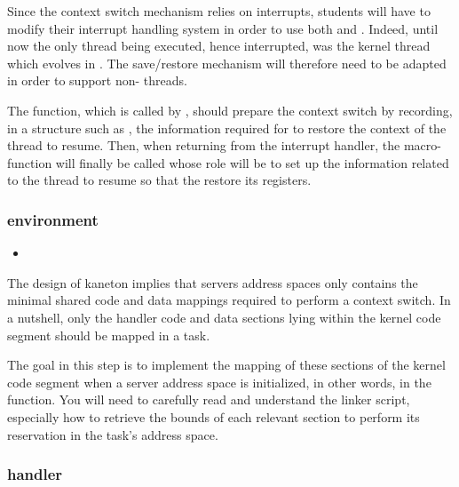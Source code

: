 Since the context switch mechanism relies on interrupts, students will
have to modify their interrupt handling system in order to use both
 and
. Indeed, until now the only thread
being executed, hence interrupted, was the kernel thread which evolves in
. The save/restore mechanism will therefore need to be adapted
in order to support non- threads.

The  function, which is called by
, should prepare the context switch by
recording, in a structure such as , the information
required for  to restore the context
of the thread to resume. Then, when returning from the interrupt handler,
the  macro-function will finally be
called whose role will be to set up the information related to the thread
to resume so that the  restore its registers.

\subsubsection*{environment}

\begin{itemize}
  \item
\end{itemize}

The design of kaneton implies that servers address spaces only contains the
minimal shared code and data mappings required to perform a context switch.
In a nutshell, only the handler code and data sections lying within the kernel
code segment should be mapped in a task.

The goal in this step is to implement the mapping of these sections of the
kernel code segment when a server address space is initialized, in other
words, in the  function.
You will need to carefully read and understand the linker script, especially
how to retrieve the bounds of each relevant section to perform its reservation
in the task's address space.

\subsubsection*{handler}

